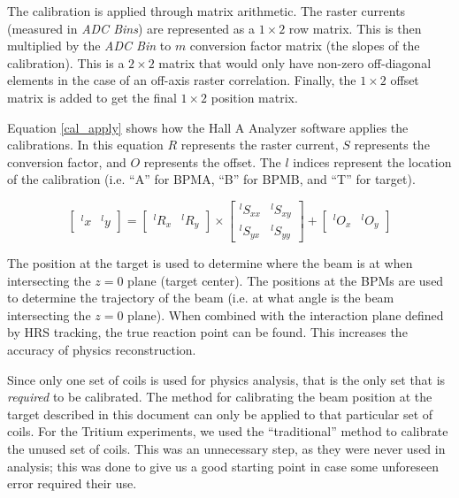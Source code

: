 The calibration is applied through matrix arithmetic. The raster currents (measured in \textit{ADC Bins}) are represented as a $1\times2$ row matrix. This is then multiplied by the \textit{ADC Bin} to $m$ conversion factor matrix (the slopes of the calibration). This is a $2\times2$ matrix that would only have non-zero off-diagonal elements in the case of an off-axis raster correlation. Finally, the $1\times2$ offset matrix is added to get the final $1\times2$ position matrix.

Equation \ref{cal_apply} shows how the Hall A Analyzer software applies the calibrations. In this equation $R$ represents the raster current, $S$ represents the conversion factor, and $O$ represents the offset. The $l$ indices represent the location of the calibration (i.e. ``A'' for BPMA, ``B'' for BPMB, and ``T'' for target).

\begin{equation}
	\begin{bmatrix}
		^lx & ^ly
	\end{bmatrix}
	=
	\begin{bmatrix}
		^lR_x & ^lR_y
	\end{bmatrix}
	\times
	\begin{bmatrix}
		^lS_{xx} & ^lS_{xy} \\
		^lS_{yx} & ^lS_{yy}
	\end{bmatrix}
	+
	\begin{bmatrix}
		^lO_x & ^lO_y
	\end{bmatrix}
	\label{cal_apply}
\end{equation}

The position at the target is used to determine where the beam is at when intersecting the $z=0$ plane (target center). The positions at the BPMs are used to determine the trajectory of the beam (i.e. at what angle is the beam intersecting the $z=0$ plane). When combined with the interaction plane defined by HRS tracking, the true reaction point can be found. This increases the accuracy of physics reconstruction.

Since only one set of coils is used for physics analysis, that is the only set that is \textit{required} to be calibrated. The method for calibrating the beam position at the target described in this document can only be applied to that particular set of coils. For the Tritium experiments, we used the ``traditional'' method to calibrate the unused set of coils. This was an unnecessary step, as they were never used in analysis; this was done to give us a good starting point in case some unforeseen error required their use.

